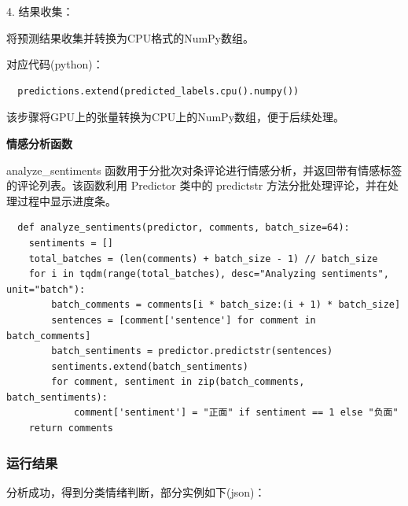 \documentclass[UTF8,a4paper,15pt,titlepage,oneside]{ctexbook}
\begin{document}
4.	结果收集：

将预测结果收集并转换为CPU格式的NumPy数组。

对应代码(python)：

\begin{mdframed}[backgroundcolor=darkgray, linecolor=lightgray, linewidth=1pt, innermargin=0.5cm, outermargin=0.5cm, skipbelow=0.1cm]
  \color{white}
  \begin{verbatim}
  predictions.extend(predicted_labels.cpu().numpy())
\end{verbatim}  
\end{mdframed}

  该步骤将GPU上的张量转换为CPU上的NumPy数组，便于后续处理。

  \vskip 0.2cm
  \noindent
  \textbf{情感分析函数}

analyze\_sentiments 函数用于分批次对条评论进行情感分析，并返回带有情感标签的评论列表。该函数利用 Predictor 类中的 predictstr 方法分批处理评论，并在处理过程中显示进度条。

\begin{mdframed}[backgroundcolor=darkgray, linecolor=lightgray, linewidth=1pt, innermargin=0.5cm, outermargin=0.5cm, skipbelow=0.1cm]
  \color{white}
  \begin{verbatim}
  def analyze_sentiments(predictor, comments, batch_size=64):
    sentiments = []
    total_batches = (len(comments) + batch_size - 1) // batch_size
    for i in tqdm(range(total_batches), desc="Analyzing sentiments", unit="batch"):
        batch_comments = comments[i * batch_size:(i + 1) * batch_size]
        sentences = [comment['sentence'] for comment in batch_comments]
        batch_sentiments = predictor.predictstr(sentences)
        sentiments.extend(batch_sentiments)
        for comment, sentiment in zip(batch_comments, batch_sentiments):
            comment['sentiment'] = "正面" if sentiment == 1 else "负面"
    return comments
  \end{verbatim}  
\end{mdframed}

\subsubsection{运行结果}
 
分析成功，得到分类情绪判断，部分实例如下(json)：
\end{document}
